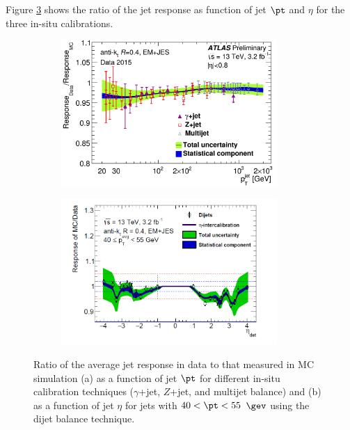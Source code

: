 Figure \ref{fig:obj:jet:respsitu} shows the ratio of the jet response as function of jet $\pt$ and $\eta$ for the three in-situ calibrations.

\begin{figure}[t!]
\begin{subfigure}{0.5\textwidth}
  \centering
  \includegraphics[width=0.9\textwidth]{figures/Objects/jetrespptsitu.png}
  \caption{}
  \label{fig:obj:jet:respsitupt}
\end{subfigure}
\begin{subfigure}{0.5\textwidth}
  \centering
  \includegraphics[width=0.9\textwidth]{figures/Objects/Combination_EIC.png}
  \caption{}
  \label{fig:obj:jet:respsitueta}
\end{subfigure}

\captionsetup{width=0.85\textwidth} \caption{\small Ratio of the average jet response in data to that measured in MC simulation (a) as a function of jet $\pt$ for different in-situ calibration techniques ($\gamma$+jet, $Z$+jet, and multijet balance) and (b) as a function of jet $\eta$ for jets with $40<\pt<55$ $\gev$ using the dijet balance technique.}
\label{fig:obj:jet:respsitu}
\end{figure}



